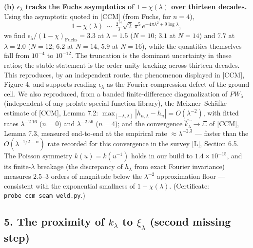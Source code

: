 \documentclass[
  letterpaper,
  11pt]{article}
\theoremstyle{plain}
\theoremstyle{definition}
\theoremstyle{remark}
\begin{document}
\textbf{(b) \(\epsilon_\lambda\) tracks the Fuchs asymptotics of \(1-\chi(\lambda)\) over thirteen decades.} Using the asymptotic quoted in {[}CCM{]} (from Fuchs, for \(n=4\)),
\[
1-\chi(\lambda)\ \sim\ \tfrac{2^{14}}{3}\sqrt2\,\pi^5\,e^{-4\pi\lambda^2 + 9\log\lambda},
\]
we find \(\epsilon_\lambda / (1-\chi)_{\mathrm{Fuchs}} = 3.3\) at \(\lambda=1.5\) (\(N{=}10\); \(3.1\) at \(N{=}14\)) and \(7.7\) at \(\lambda = 2.0\) (\(N{=}12\); \(6.2\) at \(N{=}14\), \(5.9\) at \(N{=}16\)), while the quantities themselves fall from \(10^{-4}\) to \(10^{-12}\). The truncation is the dominant uncertainty in these ratios; the stable statement is the order-unity tracking across thirteen decades. This reproduces, by an independent route, the phenomenon displayed in {[}CCM{]}, Figure 4, and supports reading \(\epsilon_\lambda\) as the Fourier-compression defect of the ground cell. We also reproduced, from a banded finite-difference diagonalization of \(PW_\lambda\) (independent of any prolate special-function library), the Meixner--Schäfke estimate of {[}CCM{]}, Lemma 7.2: \(\max_{[-\lambda,\lambda]}|h_{n,\lambda}-h_n| = O(\lambda^{-2})\), with fitted rates \(\lambda^{-2.16}\) (\(n=0\)) and \(\lambda^{-2.56}\) (\(n=4\)); and the convergence \(\widehat{k_\lambda}\to\Xi\) of {[}CCM{]}, Lemma 7.3, measured end-to-end at the empirical rate \(\approx\lambda^{-2.3}\) --- faster than the \(O(\lambda^{-1/2-\alpha})\) rate recorded for this convergence in the survey {[}L{]}, Section 6.5. The Poisson symmetry \(k(u)=k(u^{-1})\) holds in our build to \(1.4\times10^{-15}\), and its finite-\(\lambda\) breakage (the discrepancy of \(h_\lambda\) from exact Fourier invariance) measures \(2.5\)--\(3\) orders of magnitude below the \(\lambda^{-2}\) approximation floor --- consistent with the exponential smallness of \(1-\chi(\lambda)\). (Certificate: \texttt{probe\_ccm\_seam\_weld.py}.)

\subsection{\texorpdfstring{5. The proximity of \(k_\lambda\) to \(\xi_\lambda\) (second missing step)}{5. The proximity of k\_\textbackslash lambda to \textbackslash xi\_\textbackslash lambda (second missing step)}}\label{the-proximity-of-k_lambda-to-xi_lambda-second-missing-step}
\end{document}
